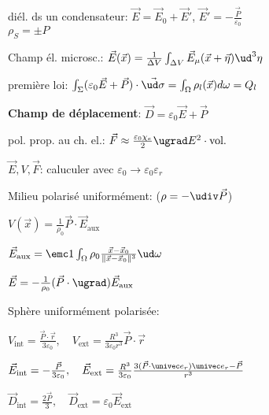    \item diél. ds un condensateur: $\vec E = \vec E_0 + \vec E'$,
         $\vec E' = - \frac{\vec P}{\varepsilon_0}$ \\
         $\rho_S = \pm P$
   \item Champ él. microsc.: $\vec E(\vec x) = \frac{1}{\Delta V} \int_{\Delta V}
                              \vec E_\mu (\vec x + \vec \eta) \ud^3 \eta$
   \item première loi: $\int_\Sigma (\varepsilon_0 \vec E + \vec P) \cdot \vec{\ud \sigma}= \int_\Omega \rho_l(\vec{x}) d\omega = Q_l$
   \item \textbf{Champ de déplacement}: $\vec D = \varepsilon_0 \vec E + \vec P$
   \item pol. prop. au ch. el.: $\vec F \approx \frac{\varepsilon_0 \chi_e}{2} \ugrad E^2 \cdot \textrm{vol.}$
   \item $\vec E, V, \vec F$: caluculer avec $\varepsilon_0 \rightarrow \varepsilon_0 \varepsilon_r$



   \item Milieu polarisé uniformément: ($\rho = - \udiv \vec P$)
    \squishlist
     \item $V(\vec x) = \frac{1}{\rho_0} \vec P \cdot \vec E_{\textrm{aux}}$
     \item $\vec E_{\textrm{aux}} = \emc 1 \int_\Omega \rho_0 \frac{\vec x - \vec x_0}{\| \vec x - \vec x_0 \|^3} \ud \omega$
     \item $\vec E = - \frac{1}{\rho_0} ( \vec P \cdot \ugrad) \vec E_{\textrm{aux}}$
    \squishend

   \item Sphère uniformément polarisée:
    \squishlist
     \item $V_{\textrm{int}} = \frac{\vec P \cdot \vec r}{3 \varepsilon_0},
            \quad V_{\textrm{ext}} = \frac{R^3}{3 \varepsilon_0 r^3} \vec P \cdot \vec r$
     \item $\vec E_{\textrm{int}} = - \frac{\vec P}{3 \varepsilon_0}, \quad
            \vec E_{\textrm{ext}} = \frac{R^3}{3 \varepsilon_0} \frac{3 ( \vec P \cdot \univec e_r) \univec e_r - \vec P}{r^3}$
     \item $\vec D_{\textrm{int}} = \frac{2 \vec P}{3}, \quad \vec D_{\textrm{ext}} = \varepsilon_0 \vec E_{\textrm{ext}}$
    \squishend

